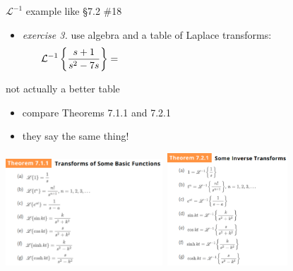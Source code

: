 \documentclass[urlcolor=blue,dvipsnames]{beamer}
\begin{document}
\begin{frame}{$\mathcal{L}^{-1}$ example like \S7.2 \#18}

\begin{itemize}
\item \emph{exercise 3.}  use algebra and a table of Laplace transforms:
    $$\LLi{\frac{s+1}{s^2-7s}} = \hspace{80mm}$$
\end{itemize}

\vspace{50mm}
\end{frame}


\begin{frame}{not actually a better table}

\begin{itemize}
\item compare Theorems 7.1.1 and 7.2.1
\item they say the same thing!
\end{itemize}

\mbox{\includegraphics[height=40mm]{figs/laplacetable.pdf} \qquad \includegraphics[height=42mm]{figs/inverselaplacetable.pdf}}

\end{frame}
\end{document}
